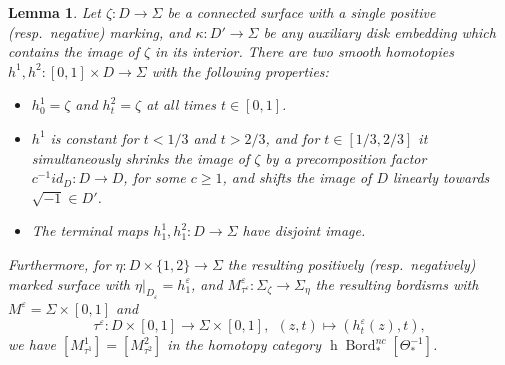 \documentclass[reqno]{amsart}
\newtheorem{lemma}{Lemma}[section]
\theoremstyle{definition}
\newcommand{\opn}[1]{\operatorname{#1}}
\DeclareMathOperator{\Bord}{Bord}
\renewcommand{\1}{\mathbf{1}}
\begin{document}
\begin{lemma}\label{lem:rel2}
Let $\zeta:D\to \Sigma$ be a connected surface with a single positive (resp.\ negative) marking, and $\kappa:D'\to \Sigma$ be any auxiliary disk embedding which contains the image of $\zeta$ in its interior.  There are two smooth homotopies $h^1,h^2:[0,1]\times D\to \Sigma$ with the following properties:
\begin{itemize}
\item $h^1_0=\zeta$ and $h^2_t=\zeta$ at all times $t\in [0,1]$.\vspace{1.5mm}
\item $h^{1}$ is constant for $t<1/3$ and $t>2/3$, and for $t\in [1/3,2/3]$ it simultaneously shrinks the image of $\zeta$ by a precomposition factor $c^{-1}id_D:D\to D$, for some $c\geq 1$, and shifts the image of $D$ linearly towards $\sqrt{-1}\in D'$.\vspace{1.5mm}
\item The terminal maps $h^{1}_1,h^2_1:D\to \Sigma$ have disjoint image.\vspace{1.5mm}
\end{itemize}
Furthermore, for $\eta:D\times \{1,2\}\to \Sigma$ the resulting positively (resp.\ negatively) marked surface with $\eta|_{D_{\varepsilon}}=h^{\varepsilon}_1$, and $M^{\varepsilon}_{\tau^{\varepsilon}}:\Sigma_{\zeta}\to \Sigma_{\eta}$ the resulting bordisms with $M^{\varepsilon}=\Sigma\times[0,1]$ and
\[
\tau^{\varepsilon}:D\times[0,1]\to \Sigma\times[0,1],\ \ (z,t)\mapsto(h^{\varepsilon}_t(z),t),
\]
we have $[M^1_{\tau^1}]=[M^2_{\tau^2}]$ in the homotopy category $\opn{h}\Bord_{\ast}^{nc}[\Theta_{\ast}^{-1}]$.
\end{lemma}
\end{document}
